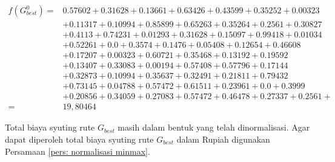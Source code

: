 {{\begin{enumerate}[align = left, left = 0cm, nolistsep]
\begin{enumerate}[label = (\alph*), align = left, left = 0cm, nolistsep]
                        {\footnotesize
                        \begin{equation*}
                            \begin{aligned}
                                f(G_{best}^{0})  = & 0.57602 + 0.31628 + 0.13661 + 0.63426 + 0.43599 + 0.35252 + 0.00323    \\
                                                   & + 0.11317 + 0.10994 + 0.85899 + 0.65263 + 0.35264 + 0.2561 + 0.30827   \\
                                                   & + 0.4113 + 0.74231 + 0.01293 + 0.31628 + 0.15097 + 0.99418 + 0.01034   \\
                                                   & + 0.52261 + 0.0 + 0.3574 + 0.1476 + 0.05408 + 0.12654 + 0.46608        \\
                                                   & + 0.17207 + 0.00323 + 0.60721 + 0.35468 + 0.13192 + 0.19592            \\
                                                   & + 0.13407 + 0.33083 + 0.00194 + 0.57408 + 0.57796 + 0.17144            \\
                                                   & + 0.32873 + 0.10994 + 0.35637 + 0.32491 + 0.21811 + 0.79432            \\
                                                   & + 0.73145 + 0.04788 + 0.57472 + 0.61511 + 0.23961 + 0.0 + 0.3999       \\
                                                   & + 0.20856 + 0.34059 + 0.27083 + 0.57472 + 0.46478 + 0.27337 + 0.2561 + \\
                                =                  & 19,80464
                            \end{aligned}
                        \end{equation*}
                        }

                        Total biaya syuting rute $G_{best}$ masih dalam bentuk yang telah dinormalisasi.
                        Agar dapat diperoleh total biaya syuting rute $G_{best}$ dalam Rupiah digunakan Persamaan \ref{pers: normalisasi minmax}.


\end{enumerate}
\end{enumerate}}}

